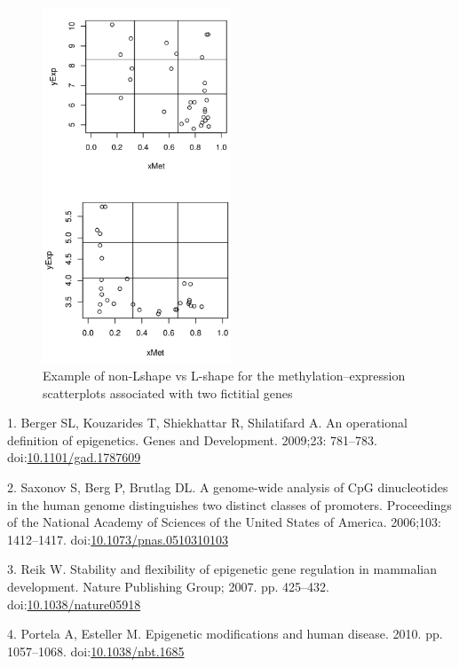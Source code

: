 \documentclass[10pt,letterpaper]{article}
\begin{document}
\begin{figure}
\hypertarget{id}{%
\centering
\includegraphics[width=0.5\textwidth,height=0.5\textheight]{figures/nonLshapeVSLshape1.png}
\caption{Example of non-Lshape vs L-shape for the
methylation--expression scatterplots associated with two fictitial
genes}\label{id}
}
\end{figure}

\hypertarget{refs}{}
\leavevmode\hypertarget{ref-Berger2009}{}%
1. Berger SL, Kouzarides T, Shiekhattar R, Shilatifard A. An operational
definition of epigenetics. Genes and Development. 2009;23: 781--783.
doi:\href{https://doi.org/10.1101/gad.1787609}{10.1101/gad.1787609}

\leavevmode\hypertarget{ref-Saxonov2006}{}%
2. Saxonov S, Berg P, Brutlag DL. A genome-wide analysis of CpG
dinucleotides in the human genome distinguishes two distinct classes of
promoters. Proceedings of the National Academy of Sciences of the United
States of America. 2006;103: 1412--1417.
doi:\href{https://doi.org/10.1073/pnas.0510310103}{10.1073/pnas.0510310103}

\leavevmode\hypertarget{ref-Reik2007}{}%
3. Reik W. Stability and flexibility of epigenetic gene regulation in
mammalian development. Nature Publishing Group; 2007. pp. 425--432.
doi:\href{https://doi.org/10.1038/nature05918}{10.1038/nature05918}

\leavevmode\hypertarget{ref-Portela2010}{}%
4. Portela A, Esteller M. Epigenetic modifications and human disease.
2010. pp. 1057--1068.
doi:\href{https://doi.org/10.1038/nbt.1685}{10.1038/nbt.1685}
\end{document}
